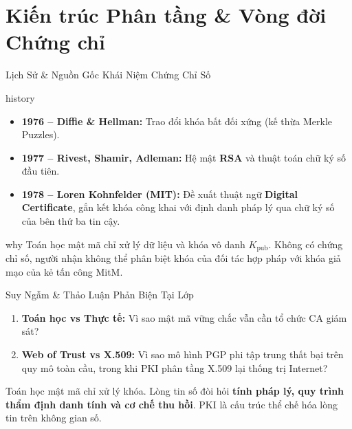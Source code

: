 \section{Kiến trúc Phân tầng \& Vòng đời Chứng chỉ}

\begin{frame}{Lịch Sử \& Nguồn Gốc Khái Niệm Chứng Chỉ Số \selfstudy}
  \begin{beyond}{history}
    \begin{itemize}\footnotesize
      \item \textbf{1976 -- Diffie \& Hellman:} Trao đổi khóa bất đối xứng (kế thừa Merkle Puzzles).
      \item \textbf{1977 -- Rivest, Shamir, Adleman:} Hệ mật \textbf{RSA} và thuật toán chữ ký số đầu tiên.
      \item \textbf{1978 -- Loren Kohnfelder (MIT):} Đề xuất thuật ngữ \textbf{Digital Certificate}, gắn kết khóa công khai với định danh pháp lý qua chữ ký số của bên thứ ba tin cậy.
    \end{itemize}
  \end{beyond}

  \begin{beyond}{why}
    \footnotesize
    Toán học mật mã chỉ xử lý dữ liệu và khóa vô danh $K_{\text{pub}}$. Không có chứng chỉ số, người nhận không thể phân biệt khóa của đối tác hợp pháp với khóa giả mạo của kẻ tấn công MitM.
  \end{beyond}
\end{frame}

\begin{frame}{Suy Ngẫm \& Thảo Luận Phản Biện Tại Lớp}
  \begin{thinkbox}
    \begin{enumerate}\footnotesize
      \item \textbf{Toán học vs Thực tế:} Vì sao mật mã vững chắc vẫn cần tổ chức CA giám sát?
      \item \textbf{Web of Trust vs X.509:} Vì sao mô hình PGP phi tập trung thất bại trên quy mô toàn cầu, trong khi PKI phân tầng X.509 lại thống trị Internet?
    \end{enumerate}
  \end{thinkbox}

  \begin{keybox}
    \footnotesize
    Toán học mật mã chỉ xử lý khóa. Lòng tin số đòi hỏi \textbf{tính pháp lý, quy trình thẩm định danh tính và cơ chế thu hồi}. PKI là cấu trúc thể chế hóa lòng tin trên không gian số.
  \end{keybox}
\end{frame}

